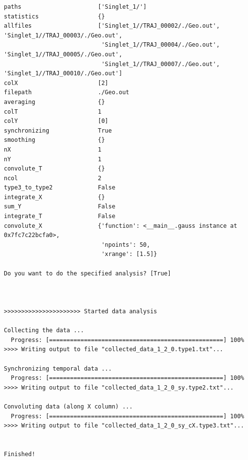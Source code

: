 \documentclass[a4paper,11pt,DIV=15,openany]{scrbook}
\begin{document}
\begin{oframed}
\begin{Verbatim}[commandchars=\\\{\}]
paths                      ['Singlet_1/']
statistics                 {}
allfiles                   ['Singlet_1//TRAJ_00002/./Geo.out', 'Singlet_1//TRAJ_00003/./Geo.out',
                            'Singlet_1//TRAJ_00004/./Geo.out', 'Singlet_1//TRAJ_00005/./Geo.out',
                            'Singlet_1//TRAJ_00007/./Geo.out', 'Singlet_1//TRAJ_00010/./Geo.out']
colX                       [2]
filepath                   ./Geo.out
averaging                  {}
colT                       1
colY                       [0]
synchronizing              True
smoothing                  {}
nX                         1
nY                         1
convolute_T                {}
ncol                       2
type3_to_type2             False
integrate_X                {}
sum_Y                      False
integrate_T                False
convolute_X                {'function': <__main__.gauss instance at 0x7fc7c22bcfa0>, 
                            'npoints': 50, 
                            'xrange': [1.5]}

Do you want to do the specified analysis? [True] 



>>>>>>>>>>>>>>>>>>>>>> Started data analysis

Collecting the data ...
  Progress: [==================================================] 100%
>>>> Writing output to file "collected_data_1_2_0.type1.txt"...

Synchronizing temporal data ...
  Progress: [==================================================] 100%
>>>> Writing output to file "collected_data_1_2_0_sy.type2.txt"...

Convoluting data (along X column) ...
  Progress: [==================================================] 100%
>>>> Writing output to file "collected_data_1_2_0_sy_cX.type3.txt"...


Finished!
\end{Verbatim}
\end{oframed}
\end{document}

